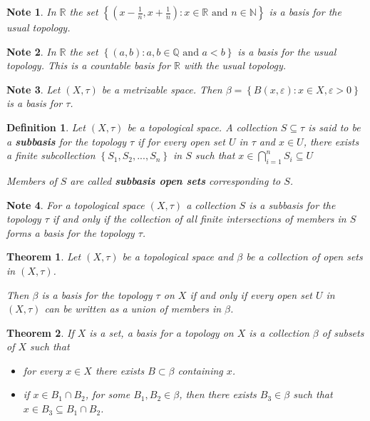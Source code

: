 \documentclass[12pt,twoside]{report}
\newtheorem{defn}{Definition}
\newtheorem{note}{Note}
\newtheorem{thm}{Theorem}
\begin{document}
\begin{note}
    In $\mathbb{R}$ the set $\left\{ \left (x - \frac{1}{n}, x + \frac{1}{n}\right )  :  x \in \mathbb{R}\text{ and }n \in \mathbb{N} \right\}$ is a basis for the usual topology.
\end{note}

\begin{note}
    In $\mathbb{R}$ the set $\left\{ \left (a, b\right )  :  a,b \in \mathbb{Q}\text{ and }a < b \right\}$ is a basis for the usual topology. This is a countable basis for $\mathbb{R}$ with the usual topology.
\end{note}

\begin{note}
    Let $\left (X, \tau\right )$ be a metrizable space. Then $\beta = \left\{ B\left (x, \varepsilon\right )  :  x \in X, \varepsilon >0 \right\}$ is a basis for $\tau$.
\end{note}

\begin{defn}
    Let $\left (X, \tau\right )$ be a topological space. A collection $S \subseteq \tau$ is said to be a \textbf{subbasis} for the topology $\tau$ if for every open set $U$ in $\tau$ and $x \in U$, there exists a finite subcollection $\left\{ S_1, S_2, ..., S_n \right\}$ in $S$ such that $x \in \displaystyle\bigcap_{i = 1}^n S_i \subseteq U$

    Members of $S$ are called \textbf{subbasis open sets} corresponding to $S$.
\end{defn}

\begin{note}
    For a topological space $\left (X, \tau\right )$ a collection $S$ is a subbasis for the topology $\tau$ if and only if the collection of all finite intersections of members in $S$ forms a basis for the topology $\tau$.
\end{note}

\begin{thm}
    Let $\left (X, \tau\right )$ be a topological space and $\beta$ be a collection of open sets in $\left (X, \tau\right )$.

    Then $\beta$ is a basis for the topology $\tau$ on $X$ if and only if every open set $U$ in $\left (X, \tau\right )$ can be written as a union of members in $\beta$.
\end{thm}

\begin{thm}
    If $X$ is a set, a basis for a topology on $X$ is a collection $\beta$ of subsets of $X$ such that 
    \begin{itemize}
        \item for every $x \in X$ there exists $B \subset \beta$ containing $x$.
        \item if $x \in B_1 \cap B_2$, for some $B_1, B_2 \in \beta$, then there exists $B_3 \in \beta$ such that $x \in B_3 \subseteq B_1 \cap B_2$.
    \end{itemize}
\end{thm}
\end{document}
